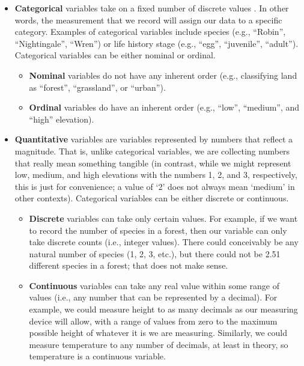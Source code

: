 \documentclass[
]{scrbook}
\providecommand{\tightlist}{%
  \setlength{\itemsep}{0pt}\setlength{\parskip}{0pt}}
\begin{document}
\begin{itemize}
\item
  \textbf{Categorical} variables take on a fixed number of discrete values \citep{Spiegelhalter2019}.
  In other words, the measurement that we record will assign our data to a specific category.
  Examples of categorical variables include species (e.g., ``Robin'', ``Nightingale'', ``Wren'') or life history stage (e.g., ``egg'', ``juvenile'', ``adult'').
  Categorical variables can be either nominal or ordinal.

  \begin{itemize}
  \tightlist
  \item
    \textbf{Nominal} variables do not have any inherent order (e.g., classifying land as ``forest'', ``grassland'', or ``urban'').
  \item
    \textbf{Ordinal} variables do have an inherent order (e.g., ``low'', ``medium'', and ``high'' elevation).
  \end{itemize}
\item
  \textbf{Quantitative} variables are variables represented by numbers that reflect a magnitude.
  That is, unlike categorical variables, we are collecting numbers that really mean something tangible (in contrast, while we might represent low, medium, and high elevations with the numbers 1, 2, and 3, respectively, this is just for convenience; a value of `2' does not always mean `medium' in other contexts).
  Categorical variables can be either discrete or continuous.

  \begin{itemize}
  \item
    \textbf{Discrete} variables can take only certain values.
    For example, if we want to record the number of species in a forest, then our variable can only take discrete counts (i.e., integer values).
    There could conceivably be any natural number of species (1, 2, 3, etc.), but there could not be 2.51 different species in a forest; that does not make sense.
  \item
    \textbf{Continuous} variables can take any real value within some range of values (i.e., any number that can be represented by a decimal).
    For example, we could measure height to as many decimals as our measuring device will allow, with a range of values from zero to the maximum possible height of whatever it is we are measuring.
    Similarly, we could measure temperature to any number of decimals, at least in theory, so temperature is a continuous variable.
  \end{itemize}
\end{itemize}
\end{document}
